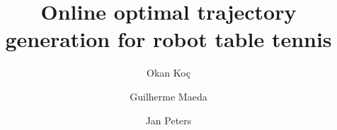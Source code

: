 \documentclass[twocolumn,authoryear,5p]{elsarticle}
\begin{document}
\title{Online optimal trajectory generation for robot table tennis}
\author[tue]{Okan Ko\c c}
\author[darm]{Guilherme Maeda}
\author[tue,darm]{Jan Peters}%
\address[tue]{Max Planck Institute for Intelligent Systems, Spemannstr. 38, 72076 Tuebingen, Germany}
\address[darm]{Technische Universit\" at Darmstadt, FG Intelligente Autonome Systeme Hochschulstr. 10, 64289 Darmstadt, Germany}

\end{document}
